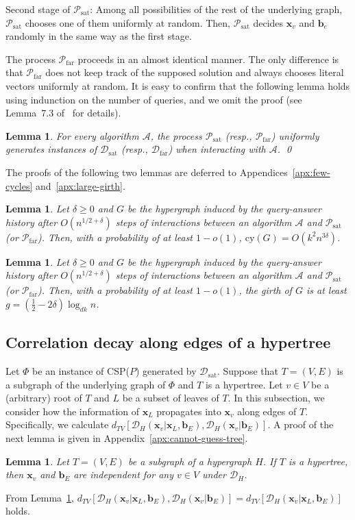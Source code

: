 \documentclass[letterpaper,11pt]{article}
\newtheorem{lemma}[theorem]{Lemma}
\newcommand{\dtv}{d_{TV}}
\newcommand{\cald}{\mathcal{D}}
\newcommand{\calpsat}{\mathcal{P}_{\mathrm{sat}}}
\newcommand{\calpfar}{\mathcal{P}_{\mathrm{far}}}
\newcommand{\caldsat}{\mathcal{D}_{\mathrm{sat}}}
\newcommand{\caldfar}{\mathcal{D}_{\mathrm{far}}}
\newcommand{\cy}{\mathrm{cy}}
\newcommand{\cala}{\mathcal{A}}
\newcommand{\bfx}{\mathbf{x}}
\newcommand{\bfb}{\mathbf{b}}
\newcommand{\csp}[1]{\textsf{CSP}(#1)\xspace}
\begin{document}
Second stage of $\calpsat$:
Among all possibilities of the rest of the underlying graph,
$\calpsat$ chooses one of them uniformly at random.
Then, $\calpsat$ decides $\bfx_v$ and $\bfb_e$ randomly in the same way as the first stage.

The process $\calpfar$ proceeds in an almost identical manner.
The only difference is that $\calpfar$ does not keep track of the supposed solution and always chooses literal vectors uniformly at random.
It is easy to confirm that the following lemma holds using indunction on the number of queries,
and we omit the proof (see Lemma~7.3 of~\cite{GR08} for details).
\begin{lemma}\label{lmm:equivalent}
  For every algorithm $\cala$, the process $\calpsat$ (resp., $\calpfar$) uniformly generates instances of $\caldsat$ (resp., $\caldfar$) when interacting with $\cala$.
  \qed
\end{lemma}
The proofs of the following two lemmas are deferred to Appendices~\ref{apx:few-cycles} and~\ref{apx:large-girth}.
\begin{lemma}\label{lmm:few-cycles}
  Let $\delta\geq 0$ and $G$ be the hypergraph induced by the query-answer history after $O(n^{1/2+\delta})$ steps of interactions between an algorithm $\cala$ and $\calpsat$ (or $\calpfar$).
  Then, with a probability of at least $1-o(1)$, $\cy(G)=O(k^2n^{3\delta})$.
\end{lemma}
\begin{lemma}\label{lmm:large-girth}
  Let $\delta \geq 0$ and $G$ be the hypergraph induced by the query-answer history after $O(n^{1/2+\delta})$ steps of interactions between an algorithm $\cala$ and $\calpsat$ (or $\calpfar$).
  Then, with a probability of at least $1-o(1)$, 
  the girth of $G$ is at least $g=(\frac{1}{2}-2\delta)\log_{dk}n$.
\end{lemma}

\subsection{Correlation decay along edges of a hypertree}
Let $\Phi$ be an instance of \csp{$P$} generated by $\caldsat$.
Suppose that $T=(V,E)$ is a subgraph of the underlying graph of $\Phi$ and $T$ is a hypertree.
Let $v\in V$ be a (arbitrary) root of $T$ and $L$ be a subset of leaves of $T$.
In this subsection,
we consider how the information of $\bfx_L$ propagates into $\bfx_v$ along edges of $T$.
Specifically, we calculate $\dtv[\cald_H(\bfx_v|\bfx_L,\bfb_E),\cald_H(\bfx_v|\bfb_E)]$.
A proof of the next lemma is given in Appendix~\ref{apx:cannot-guess-tree}.
\begin{lemma}\label{lmm:cannot-guess-tree}
  Let $T=(V,E)$ be a subgraph of a hypergraph $H$.
  If $T$ is a hypertree, 
  then $\bfx_v$ and $\bfb_E$ are independent for any $v\in V$ under $\cald_H$.
\end{lemma}
From Lemma~\ref{lmm:cannot-guess-tree},
$\dtv[\cald_H(\bfx_v|\bfx_L,\bfb_E),\cald_H(\bfx_v|\bfb_E)]=\dtv[\cald_H(\bfx_v|\bfx_L,\bfb_E)]$ holds.
\end{document}
